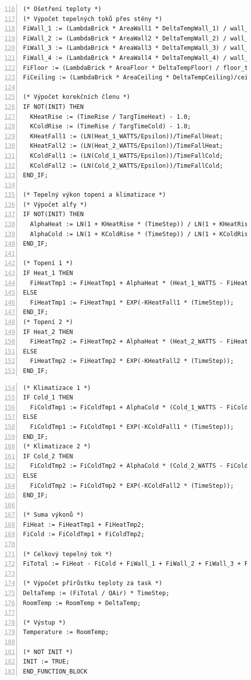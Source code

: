 \begin{lstlisting}[language=ST, breaklines=true, numbers=left, firstnumber=116, numberstyle=\small, numbersep=10pt, frame=single, basicstyle=\ttfamily\small]
(* Ošetření teploty *)
(* Výpočet tepelných toků přes stěny *)
FiWall_1 := (LambdaBrick * AreaWall1 * DeltaTempWall_1) / wall_thic1;
FiWall_2 := (LambdaBrick * AreaWall2 * DeltaTempWall_2) / wall_thic2;
FiWall_3 := (LambdaBrick * AreaWall3 * DeltaTempWall_3) / wall_thic3;
FiWall_4 := (LambdaBrick * AreaWall4 * DeltaTempWall_4) / wall_thic4;
FiFloor := (LambdaBrick * AreaFloor * DeltaTempFloor) / floor_thic;
FiCeiling := (LambdaBrick * AreaCeiling * DeltaTempCeiling)/ceiling_thic;

(* Výpočet korekčních členu *)
IF NOT(INIT) THEN
  KHeatRise := (TimeRise / TargTimeHeat) - 1.0;
  KColdRise := (TimeRise / TargTimeCold) - 1.0;
  KHeatFall1 := (LN(Heat_1_WATTS/Epsilon))/TimeFallHeat;
  KHeatFall2 := (LN(Heat_2_WATTS/Epsilon))/TimeFallHeat;
  KColdFall1 := (LN(Cold_1_WATTS/Epsilon))/TimeFallCold;
  KColdFall2 := (LN(Cold_2_WATTS/Epsilon))/TimeFallCold;
END_IF;

(* Tepelný výkon topení a klimatizace *)
(* Výpočet alfy *)
IF NOT(INIT) THEN
  AlphaHeat := LN(1 + KHeatRise * (TimeStep)) / LN(1 + KHeatRise * TimeRise);
  AlphaCold := LN(1 + KColdRise * (TimeStep)) / LN(1 + KColdRise * TimeRise);
END_IF;

(* Topení 1 *)
IF Heat_1 THEN
  FiHeatTmp1 := FiHeatTmp1 + AlphaHeat * (Heat_1_WATTS - FiHeatTmp1);
ELSE
  FiHeatTmp1 := FiHeatTmp1 * EXP(-KHeatFall1 * (TimeStep));
END_IF;
(* Topení 2 *)
IF Heat_2 THEN
  FiHeatTmp2 := FiHeatTmp2 + AlphaHeat * (Heat_2_WATTS - FiHeatTmp2);
ELSE
  FiHeatTmp2 := FiHeatTmp2 * EXP(-KHeatFall2 * (TimeStep));
END_IF;
\end{lstlisting}
\pagebreak
\begin{lstlisting}[language=ST, breaklines=true, numbers=left, firstnumber=154, numberstyle=\small, numbersep=10pt, frame=single, basicstyle=\ttfamily\small]
(* Klimatizace 1 *)
IF Cold_1 THEN
  FiColdTmp1 := FiColdTmp1 + AlphaCold * (Cold_1_WATTS - FiColdTmp1);
ELSE
  FiColdTmp1 := FiColdTmp1 * EXP(-KColdFall1 * (TimeStep));
END_IF;
(* Klimatizace 2 *)
IF Cold_2 THEN
  FiColdTmp2 := FiColdTmp2 + AlphaCold * (Cold_2_WATTS - FiColdTmp2);
ELSE
  FiColdTmp2 := FiColdTmp2 * EXP(-KColdFall2 * (TimeStep));
END_IF;

(* Suma výkonů *)
FiHeat := FiHeatTmp1 + FiHeatTmp2;
FiCold := FiColdTmp1 + FiColdTmp2;

(* Celkový tepelný tok *)
FiTotal := FiHeat - FiCold + FiWall_1 + FiWall_2 + FiWall_3 + FiWall_4 + FiFloor + FiCeiling;

(* Výpočet přírůstku teploty za task *)
DeltaTemp := (FiTotal / QAir) * TimeStep;
RoomTemp := RoomTemp + DeltaTemp;

(* Výstup *)
Temperature := RoomTemp;

(* NOT INIT *)
INIT := TRUE;
END_FUNCTION_BLOCK
\end{lstlisting}
\newpage
